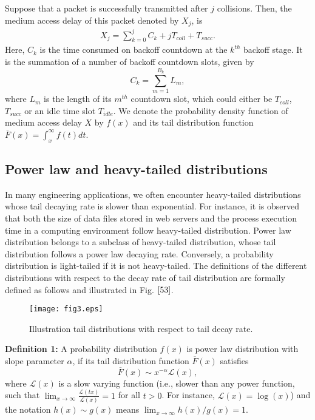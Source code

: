 \documentclass[journal]{IEEEtran}
\begin{document}
Suppose that a packet is successfully transmitted after $j$ collisions. Then, the medium access delay of this packet denoted by $X_j$, is
\begin{equation}
\label{8}
\begin{aligned}
X_j = \sum_{k=0}^{j}C_k + jT_{coll} + T_{succ}.
\end{aligned}
\end{equation}
Here, $C_k$ is the time consumed on backoff countdown at the $k^{th}$ backoff stage. It is the summation of a number of backoff countdown slots, given by
\begin{equation}
\label{32}
 C_k=\sum_{m=1}^{B_k}L_m,
\end{equation}
where $L_m$ is the length of its $m^{th}$ countdown slot, which could either be $T_{coll}$, $T_{succ}$ or an idle time slot $T_{idle}$. We denote the probability density function of medium access delay $X$ by $f(x)$ and its tail distribution function $\overline{F}(x)=\int_{x}^{\infty}f(t)dt$.

\subsection{Power law and heavy-tailed distributions}
In many engineering applications, we often encounter heavy-tailed distributions whose tail decaying rate is slower than exponential\cite{2003:Asmussen}. For instance, it is observed that both the size of data files stored in web servers and the process execution time in a computing environment follow heavy-tailed distribution\cite{2001:Crovella}. Power law distribution belongs to a subclass of heavy-tailed distribution, whose tail distribution follows a power law decaying rate. Conversely, a probability distribution is light-tailed if it is not heavy-tailed. The definitions of the different distributions with respect to the decay rate of tail distribution are formally defined as follows and illustrated in Fig. $\ref{53}$.

\begin{figure}
\centering
  \begin{center}
    \texttt{[image: fig3.eps]}
  \end{center}
  \caption{Illustration tail distributions with respect to tail decay rate.}
  \label{53}
\end{figure}

\textbf{Definition 1:} A probability distribution $f(x)$ is power law distribution with slope parameter $\alpha$, if its tail distribution function $\overline{F}(x)$ satisfies
\begin{equation}
\label{44}
\overline{F}(x) \sim x^{-\alpha}\mathcal{L}(x),
\end{equation}
where $\mathcal{L}(x)$ is a slow varying function (i.e., slower than any power function, such that $\lim_{x\rightarrow \infty} \frac{\mathcal{L}(tx)}{\mathcal{L}(x)}=1$ for all $t>0$. For instance, $\mathcal{L}(x)=\log(x)$) and the notation $h(x)\sim g(x)$ means $\lim_{x\rightarrow \infty} h(x)/g(x)=1$.
\end{document}
